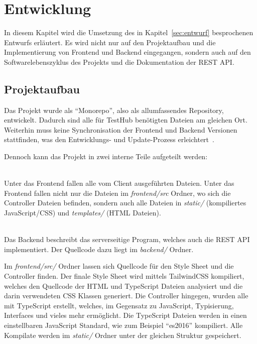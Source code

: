 \section{Entwicklung}
In diesem Kapitel wird die Umsetzung des in Kapitel~\ref{sec:entwurf} besprochenen
Entwurfs erläutert. Es wird nicht nur auf den Projektaufbau und die Implementierung 
von \gls{Frontend} und \gls{Backend} eingegangen, sondern auch auf den 
Softwarelebenszyklus des Projekts und die Dokumentation der \gls{REST} \gls{API}.

\subsection{Projektaufbau}
Das Projekt wurde als ``Monorepo'', also als allumfassendes Repository, entwickelt.
Dadurch sind alle für TestHub benötigten Dateien am gleichen Ort. Weiterhin muss 
keine Synchronisation der Frontend und Backend Versionen stattfinden, was den
Entwicklungs- und Update-Prozess erleichtert~\cite{PL16}.

Dennoch kann das Projekt in zwei interne Teile aufgeteilt werden:

\begin{description}
    \hfill\\
    Unter das Frontend fallen alle vom Client ausgeführten Dateien. Unter das Frontend
    fallen nicht nur die Dateien im \textit{frontend/src} Ordner, wo sich die 
    Controller Dateien befinden, sondern auch alle Dateien in \textit{static/} (kompiliertes JavaScript/CSS) 
    und \textit{templates/} (HTML Dateien).

    \hfill\\
    Das Backend beschreibt das serverseitige Program, welches auch die \gls{REST} \gls{API}
    implementiert. Der Quellcode dazu liegt im \textit{backend/} Ordner.
\end{description}

Im \textit{frontend/src/} Ordner lassen sich Quellcode für den Style Sheet und 
die Controller finden. Der finale Style Sheet wird mittels TailwindCSS
kompiliert, welches den Quellcode der HTML und TypeScript Dateien analysiert und
die darin verwendeten \gls{CSS} Klassen generiert. Die Controller hingegen, wurden alle mit 
TypeScript erstellt, welches, im Gegensatz zu 
JavaScript, Typisierung, Interfaces und vieles mehr ermöglicht. Die TypeScript Dateien 
werden in einen einstellbaren JavaScript Standard, wie zum Beispiel ``es2016''
kompiliert. Alle Kompilate werden im \textit{static/} Ordner unter der gleichen 
Struktur gespeichert.

